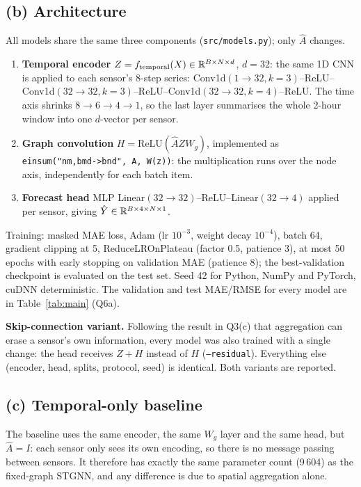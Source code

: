 \subsection*{(b) Architecture}
All models share the same three components (\texttt{src/models.py}); only $\hat A$ changes.
\begin{enumerate}
\item \textbf{Temporal encoder} $Z=f_{\text{temporal}}(X)\in\mathbb{R}^{B\times N\times d}$, $d=32$: the same 1D CNN is applied to
each sensor's 8-step series: Conv1d$(1\!\to\!32,k{=}3)$--ReLU--Conv1d$(32\!\to\!32,k{=}3)$--ReLU--Conv1d$(32\!\to\!32,k{=}4)$--ReLU.
The time axis shrinks $8\to6\to4\to1$, so the last layer summarises the whole 2-hour window into one $d$-vector per sensor.
\item \textbf{Graph convolution} $H=\mathrm{ReLU}(\hat A Z W_g)$, implemented as
\texttt{einsum("nm,bmd->bnd", A, W(z))}: the multiplication runs over the node axis, independently for each batch item.
\item \textbf{Forecast head} MLP Linear$(32\!\to\!32)$--ReLU--Linear$(32\!\to\!4)$ applied per sensor, giving
$\hat Y\in\mathbb{R}^{B\times4\times N\times1}$.
\end{enumerate}
Training: masked MAE loss, Adam (lr $10^{-3}$, weight decay $10^{-4}$), batch 64, gradient clipping at 5,
ReduceLROnPlateau (factor 0.5, patience 3), at most 50 epochs with early stopping on validation MAE (patience 8); the
best-validation checkpoint is evaluated on the test set. Seed 42 for Python, NumPy and PyTorch, cuDNN deterministic.
The validation and test MAE/RMSE for every model are in Table~\ref{tab:main} (Q6a).

\noindent\textbf{Skip-connection variant.} Following the result in Q3(c) that aggregation can erase a sensor's own
information, every model was also trained with a single change: the head receives $Z+H$ instead of $H$
(\texttt{--residual}). Everything else (encoder, head, splits, protocol, seed) is identical. Both variants are reported.

\subsection*{(c) Temporal-only baseline}
The baseline uses the same encoder, the same $W_g$ layer and the same head, but $\hat A=I$: each sensor only sees its
own encoding, so there is no message passing between sensors. It therefore has exactly the same parameter count (9\,604)
as the fixed-graph STGNN, and any difference is due to spatial aggregation alone.

